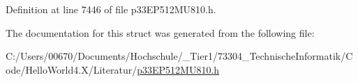 Definition at line 7446 of file p33\+E\+P512\+M\+U810.\+h.



The documentation for this struct was generated from the following file\+:\begin{DoxyCompactItemize}
\item 
C\+:/\+Users/00670/\+Documents/\+Hochschule/\+\_\+\+Tier1/73304\+\_\+\+Technische\+Informatik/\+Code/\+Hello\+World4.\+X/\+Literatur/\hyperlink{p33_e_p512_m_u810_8h}{p33\+E\+P512\+M\+U810.\+h}\end{DoxyCompactItemize}
